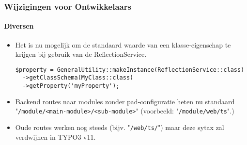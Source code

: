 \begin{frame}[fragile]
	\frametitle{Wijzigingen voor Ontwikkelaars}
	\framesubtitle{Diversen}

	\lstset{basicstyle=\tiny\ttfamily}

	\begin{itemize}
		\item Het is nu mogelijk om de standaard waarde van een klasse-eigenschap
			te krijgen bij gebruik van de ReflectionService.

\begin{lstlisting}
$property = GeneralUtility::makeInstance(ReflectionService::class)
  ->getClassSchema(MyClass::class)
  ->getProperty('myProperty');
\end{lstlisting}

		\item Backend routes naar modules zonder pad-configuratie heten nu\newline
			standaard "\texttt{/module/<main-module>/<sub-module>}"\newline
			\small
				(voorbeeld: "\texttt{/module/web/ts}".)
			\normalsize

		\item Oude routes werken nog steeds (bijv. "\texttt{/web/ts/}") maar deze sytax zal verdwijnen in TYPO3 v11.

	\end{itemize}

\end{frame}


